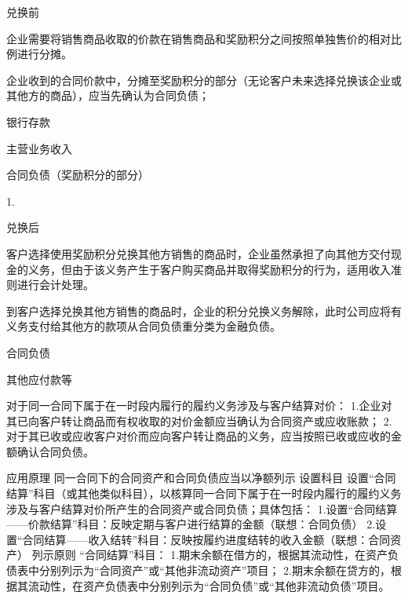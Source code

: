 \documentclass[UTF8,12pt]{ctexart}
\newenvironment{Dr}{%
	\begin{list}{}%
		{
			\setlength{\leftmargin}{2em}
			\setlength{\labelwidth}{2em}
			\setlength{\labelsep}{0pt}
			\setlength{\itemindent}{0pt}
			\setlength{\listparindent}{0pt}
			\setlength{\parsep}{0pt}
			\setlength{\topsep}{0pt}
		}
		\item[\textbf{借：}]
	}{%
	\end{list}
}
\newenvironment{Cr}{%
	\begin{list}{}%
		{
			\setlength{\leftmargin}{2em}
			\setlength{\labelwidth}{2em}
			\setlength{\labelsep}{0pt}
			\setlength{\itemindent}{0pt}
			\setlength{\listparindent}{0pt}
			\setlength{\parsep}{0pt}
			\setlength{\topsep}{0pt}
		}
		\item[\textbf{贷：}]
	}{%
	\end{list}
}
\numberwithin{equation}{section} %
\numberwithin{figure}{section}
\numberwithin{table}{section}
\begin{document}
	兑换前
	\begin{enumerate}
		\item 企业需要将销售商品收取的价款在销售商品和奖励积分之间按照单独售价的相对比例进行分摊。
		
		\item 企业收到的合同价款中，分摊至奖励积分的部分（无论客户未来选择兑换该企业或其他方的商品），应当先确认为合同负债；
		
		\begin{Dr}
			银行存款
		\end{Dr}
		\begin{Cr}
			主营业务收入
			
			合同负债（奖励积分的部分）
		\end{Cr}
	\end{enumerate}	1.

	兑换后	
	\begin{enumerate}
		\item 客户选择使用奖励积分兑换其他方销售的商品时，企业虽然承担了向其他方交付现金的义务，但由于该义务产生于客户购买商品并取得奖励积分的行为，适用收入准则进行会计处理。
		
		\item 到客户选择兑换其他方销售的商品时，企业的积分兑换义务解除，此时公司应将有义务支付给其他方的款项从合同负债重分类为金融负债。
		
		\begin{Dr}
			合同负债
		\end{Dr}
		\begin{Cr}
			其他应付款等
		\end{Cr}
	\end{enumerate}

	对于同一合同下属于在一时段内履行的履约义务涉及与客户结算对价：
	1.企业对其已向客户转让商品而有权收取的对价金额应当确认为合同资产或应收账款；
	2.对于其已收或应收客户对价而应向客户转让商品的义务，应当按照已收或应收的金额确认合同负债。
	
	应用原理	同一合同下的合同资产和合同负债应当以净额列示
	设置科目	设置“合同结算”科目（或其他类似科目），以核算同一合同下属于在一时段内履行的履约义务涉及与客户结算对价所产生的合同资产或合同负债；具体包括：
	1.设置“合同结算——价款结算”科目：反映定期与客户进行结算的金额（联想：合同负债）
	2.设置“合同结算——收入结转”科目：反映按履约进度结转的收入金额（联想：合同资产）
	列示原则	“合同结算”科目：
	1.期末余额在借方的，根据其流动性，在资产负债表中分别列示为“合同资产”或“其他非流动资产”项目；
	2.期末余额在贷方的，根据其流动性，在资产负债表中分别列示为“合同负债”或“其他非流动负债”项目。
	
\end{document}
